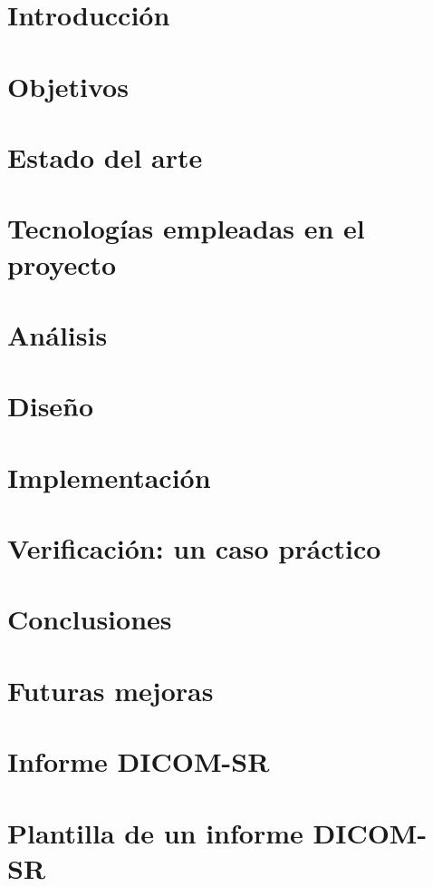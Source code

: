 \documentclass[12pt,a4paper,titlepage,twoside]{report}
\begin{document}
\chapter{Introducción}


\chapter{Objetivos}


\chapter{Estado del arte }\label{arte}


\chapter{Tecnologías empleadas en el proyecto}


\chapter{Análisis}


\chapter{Diseño}


\chapter{Implementación}


\chapter{Verificación: un caso práctico}


\chapter{Conclusiones}

\chapter{Futuras mejoras}




\appendix
\chapter{Informe DICOM-SR}\label{dicom-sr}


\chapter{Plantilla de un informe DICOM-SR}\label{dicom-sr-template}

\end{document}
